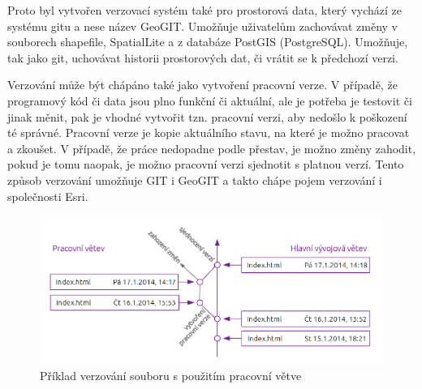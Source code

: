         Proto byl vytvořen verzovací systém také pro prostorová data, který vychází ze
        systému gitu a nese název GeoGIT. Umožňuje uživatelům zachovávat změny v
        souborech shapefile, SpatialLite a z databáze PostGIS (PostgreSQL). Umožňuje,
        tak jako git, uchovávat historii prostorových dat, či vrátit se k předchozí
        verzi. 

        Verzování může být chápáno také jako vytvoření pracovní verze. V případě, že
        programový kód či data jsou plno funkční či aktuální, ale je potřeba je
        testovit či jinak měnit, pak je vhodné vytvořit tzn. pracovní verzi, aby
        nedošlo k poškození té správné. Pracovní verze je kopie aktuálního stavu, na
        které je možno pracovat a zkoušet. V případě, že práce nedopadne podle přestav,
        je možno změny zahodit, pokud je tomu naopak, je možno pracovní verzi sjednotit
        s platnou verzí. Tento způsob verzování umožňuje GIT i GeoGIT a takto chápe
        pojem verzování i společnosti Esri.

          \begin{figure}[H]
            \centering
            \includegraphics[scale=1]{../../../grafy/obr/schema_verzovani_branch_maxiTence.png}
            \caption {Příklad verzování souboru s použitím pracovní větve}
          \end{figure}

        

